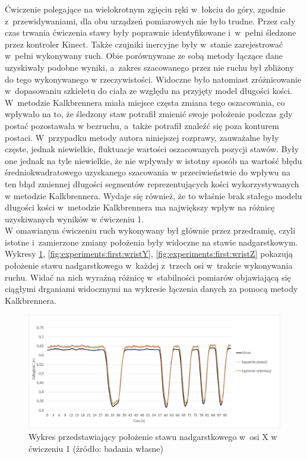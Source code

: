 Ćwiczenie polegające na wielokrotnym zgięciu ręki w~łokciu do góry, zgodnie z~przewidywaniami, dla obu urządzeń pomiarowych nie było trudne. Przez cały czas trwania ćwiczenia stawy były poprawnie identyfikowane i~w~pełni śledzone przez kontroler Kinect. Także czujniki inercyjne były w~stanie zarejestrować w~pełni  wykonywany ruch. Obie porównywane ze sobą metody łączące dane uzyskiwały podobne wyniki, a~zakres szacowanego przez nie ruchu był zbliżony do tego wykonywanego w rzeczywistości. Widoczne było natomiast zróżnicowanie w~dopasowaniu szkieletu do ciała ze względu na przyjęty model długości kości. W~metodzie Kalkbrennera miała miejsce częsta zmiana tego oszacowania, co wpływało na to, że śledzony staw potrafił zmienić swoje położenie podczas gdy postać pozostawała w bezruchu, a~także potrafił znaleźć się poza konturem postaci. W~przypadku metody autora niniejszej rozprawy, zauważalne były częste, jednak niewielkie, fluktuacje wartości oszacowanych pozycji stawów. Były one jednak na tyle niewielkie, że nie wpływały w istotny sposób na wartość błędu średniokwadratowego uzyskanego szacowania w przeciwieństwie do wpływu na ten błąd zmiennej długości segmentów reprezentujących kości wykorzystywanych w metodzie Kalkbrennera. Wydaje się również, że to właśnie brak stałego modelu długości kości w~metodzie Kalkbrennera ma największy wpływ na różnicę uzyskiwanych wyników w ćwiczeniu 1. \\
						
W omawianym ćwiczeniu ruch wykonywany był głównie przez przedramię, czyli istotne i~zamierzone zmiany położenia były widoczne na stawie nadgarstkowym. Wykresy \ref{fig:experiments:first:wristX}, \ref{fig:experiments:first:wristY}, \ref{fig:experiments:first:wristZ} pokazują położenie stawu nadgarstkowego w~każdej z~trzech osi w~trakcie wykonywania ruchu. Widać na nich wyraźną różnicę w~stabilności pomiarów objawiającą się ciągłymi drganiami widocznymi na wykresie łączenia danych za pomocą metody Kalkbrennera.
						
\begin{savenotes}
	\begin{figure}[!htb]
		\centering
		\includegraphics[width=\textwidth]{images/100/Slide4.png}
		\caption{Wykres przedstawiający położenie stawu nadgarstkowego w~osi X w ćwiczeniu 1 (źródło: badania własne)}
		\label{fig:experiments:first:wristX}
	\end{figure}
\end{savenotes}
								
